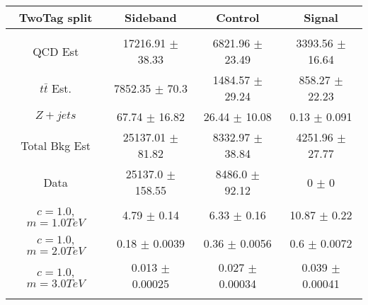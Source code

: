 \begin{footnotesize} 
\begin{tabular}{c|c|c|c} 
TwoTag split & Sideband & Control & Signal \\ 
\hline\hline 
& & & \\ 
QCD Est & 17216.91 $\pm$ 38.33 & 6821.96 $\pm$ 23.49 & 3393.56 $\pm$ 16.64\\ 
$t\bar{t}$ Est.  & 7852.35 $\pm$ 70.3 & 1484.57 $\pm$ 29.24 & 858.27 $\pm$ 22.23\\ 
$Z+jets$ & 67.74 $\pm$ 16.82 & 26.44 $\pm$ 10.08 & 0.13 $\pm$ 0.091\\ 
Total Bkg Est & 25137.01 $\pm$ 81.82 & 8332.97 $\pm$ 38.84 & 4251.96 $\pm$ 27.77\\ 
Data & 25137.0 $\pm$ 158.55 & 8486.0 $\pm$ 92.12 & 0 $\pm$ 0\\ 
$c=1.0$,$m=1.0TeV$ & 4.79 $\pm$ 0.14 & 6.33 $\pm$ 0.16 & 10.87 $\pm$ 0.22\\ 
$c=1.0$,$m=2.0TeV$ & 0.18 $\pm$ 0.0039 & 0.36 $\pm$ 0.0056 & 0.6 $\pm$ 0.0072\\ 
$c=1.0$,$m=3.0TeV$ & 0.013 $\pm$ 0.00025 & 0.027 $\pm$ 0.00034 & 0.039 $\pm$ 0.00041\\ 
& & & \\ 
\hline\hline 
\end{tabular} 
\end{footnotesize} 
\newline 
